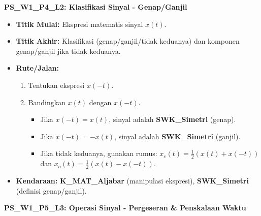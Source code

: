 \documentclass[
  letterpaper,
  DIV=11,
  numbers=noendperiod]{scrreprt}
\providecommand{\tightlist}{%
  \setlength{\itemsep}{0pt}\setlength{\parskip}{0pt}}
\begin{document}
\textbf{PS\_W1\_P4\_L2: Klasifikasi Sinyal - Genap/Ganjil}

\begin{itemize}
\tightlist
\item
  \textbf{Titik Mulai:} Ekspresi matematis sinyal \(x(t)\).
\item
  \textbf{Titik Akhir:} Klasifikasi (genap/ganjil/tidak keduanya) dan
  komponen genap/ganjil jika tidak keduanya.
\item
  \textbf{Rute/Jalan:}

  \begin{enumerate}
  \def\labelenumi{\arabic{enumi}.}
  \tightlist
  \item
    Tentukan ekspresi \(x(-t)\).
  \item
    Bandingkan \(x(t)\) dengan \(x(-t)\).

    \begin{itemize}
    \tightlist
    \item
      Jika \(x(-t) = x(t)\), sinyal adalah \textbf{SWK\_Simetri}
      (genap).
    \item
      Jika \(x(-t) = -x(t)\), sinyal adalah \textbf{SWK\_Simetri}
      (ganjil).
    \item
      Jika tidak keduanya, gunakan rumus:
      \(x_e(t) = \frac{1}{2}(x(t) + x(-t))\) dan
      \(x_o(t) = \frac{1}{2}(x(t) - x(-t))\).
    \end{itemize}
  \end{enumerate}
\item
  \textbf{Kendaraan:} \textbf{K\_MAT\_Aljabar} (manipulasi ekspresi),
  \textbf{SWK\_Simetri} (definisi genap/ganjil).
\end{itemize}

\textbf{PS\_W1\_P5\_L3: Operasi Sinyal - Pergeseran \& Penskalaan Waktu}
\end{document}
